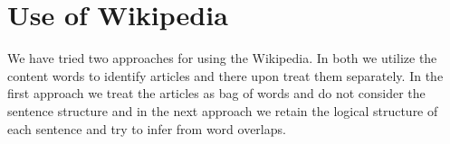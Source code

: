 \documentclass[11pt]{article}
\begin{document}
\section{Use of Wikipedia}
\label{sec:UseOfWikipedia}
We have tried two approaches for using the Wikipedia. In both we utilize the content words to identify articles and there upon treat them separately. In the first approach we treat the articles as bag of words and do not consider the sentence structure and in the next approach we retain the logical structure of each sentence and try to infer from word overlaps.
 

\label{Mar29toApr12}
\end{document}
